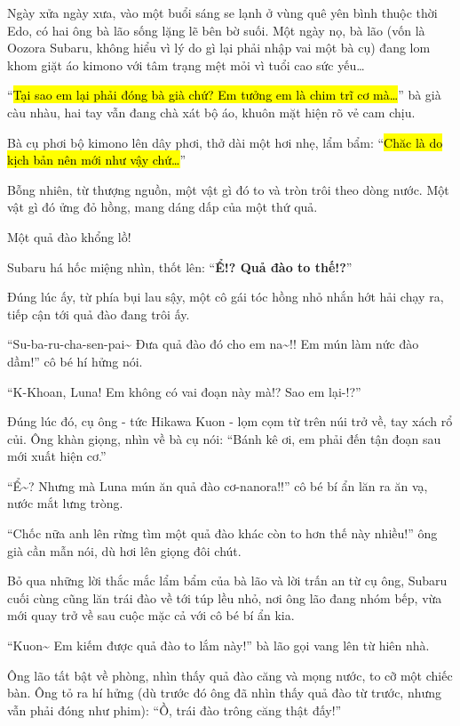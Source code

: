 \documentclass[../main.tex]{subfiles}
\begin{document}
Ngày xửa ngày xưa, vào một buổi sáng se lạnh ở vùng quê yên bình thuộc thời Edo, có hai ông bà lão sống lặng lẽ bên bờ suối. Một ngày nọ, bà lão (vốn là Oozora Subaru, không hiểu vì lý do gì lại phải nhập vai một bà cụ) đang lom khom giặt áo kimono với tâm trạng mệt mỏi vì tuổi cao sức yếu\dots

``\hl{Tại sao em lại phải đóng bà già chứ? Em tưởng em là chim trĩ cơ mà\dots}'' bà già càu nhàu, hai tay vẫn đang chà xát bộ áo, khuôn mặt hiện rõ vẻ cam chịu.

Bà cụ phơi bộ kimono lên dây phơi, thở dài một hơi nhẹ, lẩm bẩm: ``\hl{Chăc là do kịch bản nên mới như vậy chứ\dots}''

Bỗng nhiên, từ thượng nguồn, một vật gì đó to và tròn trôi theo dòng nước. Một vật gì đó ửng đỏ hồng, mang dáng dấp của một thứ quả.

Một quả đào khổng lồ!

Subaru há hốc miệng nhìn, thốt lên: ``\textbf{Ể!? Quả đào to thế!?}''

Đúng lúc ấy, từ phía bụi lau sậy, một cô gái tóc hồng nhỏ nhắn hớt hải chạy ra, tiếp cận tới quả đào đang trôi ấy.

``Su-ba-ru-cha-sen-pai\~{} Đưa quả đào đó cho em na\~{}!! Em mún làm nức đào dầm!'' cô bé hí hửng nói.

``K-Khoan, Luna! Em không có vai đoạn này mà!? Sao em lại-!?''

Đúng lúc đó, cụ ông - tức Hikawa Kuon - lọm cọm từ trên núi trở về, tay xách rổ củi. Ông khàn giọng, nhìn về bà cụ nói: ``Bánh kê ơi, em phải đến tận đoạn sau mới xuất hiện cơ.''

``Ể\~{}? Nhưng mà Luna mún ăn quả đào cơ-nanora!!'' cô bé bí ẩn lăn ra ăn vạ, nước mắt lưng tròng.

``Chốc nữa anh lên rừng tìm một quả đào khác còn to hơn thế này nhiều!'' ông già cần mẫn nói, dù hơi lên giọng đôi chút.

Bỏ qua những lời thắc mắc lẩm bẩm của bà lão và lời trấn an từ cụ ông, Subaru cuối cùng cũng lăn trái đào về tới túp lều nhỏ, nơi ông lão đang nhóm bếp, vừa mới quay trở về sau cuộc mặc cả với cô bé bí ẩn kia.

``Kuon\~{} Em kiếm được quả đào to lắm này!'' bà lão gọi vang lên từ hiên nhà.

Ông lão tất bật về phòng, nhìn thấy quả đào căng và mọng nước, to cỡ một chiếc bàn. Ông tỏ ra hí hửng (dù trước đó ông đã nhìn thấy quả đào từ trước, nhưng vẫn phải đóng như phim): ``Ồ, trái đào trông căng thật đấy!''
\end{document}
